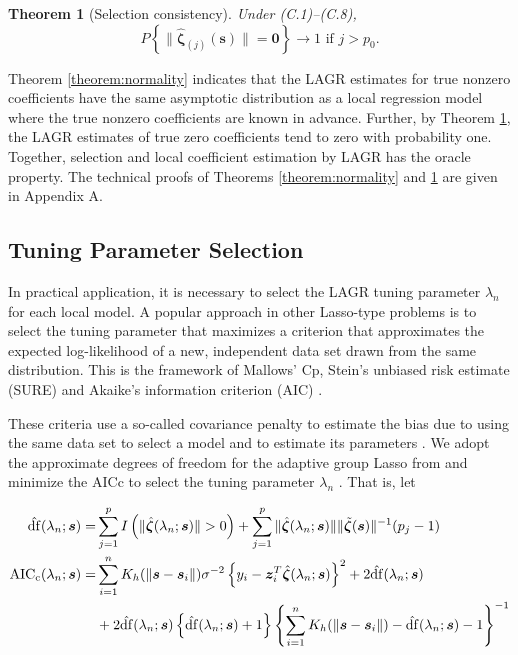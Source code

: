 \documentclass[authoryear,review, 12pt]{elsarticle}
\newtheorem{thm}{Theorem}
\begin{document}
\begin{thm}[Selection consistency]
\label{theorem:selection} Under (C.1)--(C.8), 
\[
P\left\{ \|\hat{\bm{\zeta}}_{(j)}(\bm{s})\|=\bm{0}\right\} \to1\text{ if }j>p_{0}.
\]
\end{thm}
Theorem \ref{theorem:normality} indicates that the LAGR estimates
for true nonzero coefficients have the same asymptotic distribution
as a local regression model where the true nonzero coefficients are
known in advance. Further, by Theorem \ref{theorem:selection}, the
LAGR estimates of true zero coefficients tend to zero with probability
one. Together, selection and local coefficient estimation by LAGR
has the oracle property. The technical proofs of Theorems \ref{theorem:normality}
and \ref{theorem:selection} are given in Appendix A.

\subsection{Tuning Parameter Selection}

In practical application, it is necessary to select the LAGR tuning
parameter $\lambda_{n}$ for each local model. A popular approach
in other Lasso-type problems is to select the tuning parameter that
maximizes a criterion that approximates the expected log-likelihood
of a new, independent data set drawn from the same distribution. This
is the framework of Mallows' Cp, Stein's unbiased risk estimate (SURE)
and Akaike's information criterion (AIC) \citep{Mallows-1973,Stein-1981,Akaike-1973}.

These criteria use a so-called covariance penalty to estimate the
bias due to using the same data set to select a model and to estimate
its parameters \citep{Efron:2004a}. We adopt the approximate degrees
of freedom for the adaptive group Lasso from \citet{Yuan-Lin-2006}
and minimize the AICc to select the tuning parameter $\lambda_{n}$
\citep{Hurvich-1998}. That is, let

\begin{align*}
\hat{{\rm df}}(\lambda_{n};\bm{s})= & \sum_{j=1}^{p}I\left(\|\hat{\bm{\zeta}}(\lambda_{n};\bm{s})\|>0\right)+\sum_{j=1}^{p}\|\hat{\bm{\zeta}}(\lambda_{n};\bm{s})\|\|\tilde{\bm{\zeta}}(\bm{s})\|^{-1}(p_{j}-1)\\
\text{AIC}_{{\rm c}}(\lambda_{n};\bm{s})= & \sum_{i=1}^{n}K_{h}(\|\bm{s}-\bm{s}_{i}\|)\sigma^{-2}\left\{ y_{i}-\bm{z}_{i}^{T}\hat{\bm{\zeta}}(\lambda_{n};\bm{s})\right\} ^{2}+2\hat{{\rm df}}(\lambda_{n};\bm{s})\\
 & +2\hat{{\rm df}}(\lambda_{n};\bm{s})\left\{ \hat{{\rm df}}(\lambda_{n};\bm{s})+1\right\} \left\{ \sum_{i=1}^{n}K_{h}(\|\bm{s}-\bm{s}_{i}\|)-\hat{{\rm df}}(\lambda_{n};\bm{s})-1\right\} ^{-1}
\end{align*}
\end{document}
